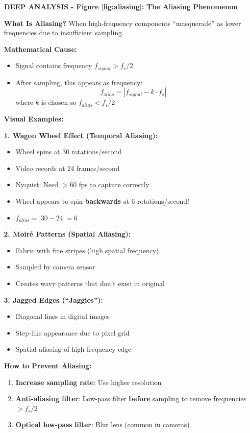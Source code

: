 \documentclass[12pt,a4paper]{article}
\begin{document}
\begin{deepexplanation}
\textbf{DEEP ANALYSIS - Figure \ref{fig:aliasing}: The Aliasing Phenomenon}

\textbf{What Is Aliasing?}
When high-frequency components ``masquerade'' as lower frequencies due to insufficient sampling.

\textbf{Mathematical Cause:}
\begin{itemize}
    \item Signal contains frequency $f_{signal} > f_s/2$
    \item After sampling, this appears as frequency:
    \[
    f_{alias} = |f_{signal} - k \cdot f_s|
    \]
    where $k$ is chosen so $f_{alias} < f_s/2$
\end{itemize}

\textbf{Visual Examples:}

\textbf{1. Wagon Wheel Effect (Temporal Aliasing):}
\begin{itemize}
    \item Wheel spins at 30 rotations/second
    \item Video records at 24 frames/second
    \item Nyquist: Need $> 60$ fps to capture correctly
    \item Wheel appears to spin \textbf{backwards} at 6 rotations/second!
    \item $f_{alias} = |30 - 24| = 6$
\end{itemize}

\textbf{2. Moiré Patterns (Spatial Aliasing):}
\begin{itemize}
    \item Fabric with fine stripes (high spatial frequency)
    \item Sampled by camera sensor
    \item Creates wavy patterns that don't exist in original
\end{itemize}

\textbf{3. Jagged Edges (``Jaggies''):}
\begin{itemize}
    \item Diagonal lines in digital images
    \item Step-like appearance due to pixel grid
    \item Spatial aliasing of high-frequency edge
\end{itemize}

\textbf{How to Prevent Aliasing:}
\begin{enumerate}
    \item \textbf{Increase sampling rate}: Use higher resolution
    \item \textbf{Anti-aliasing filter}: Low-pass filter \textbf{before} sampling to remove frequencies $> f_s/2$
    \item \textbf{Optical low-pass filter}: Blur lens (common in cameras)
\end{enumerate}
\end{deepexplanation}
\end{document}
